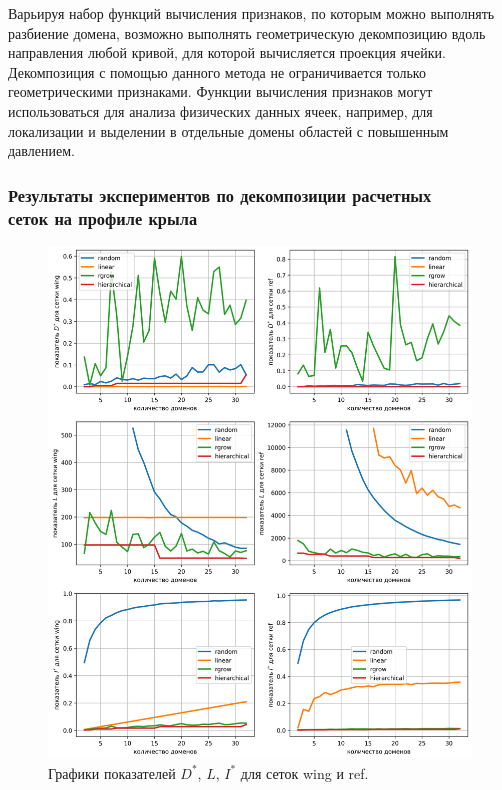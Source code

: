 Варьируя набор функций вычисления признаков, по которым можно выполнять разбиение домена, возможно выполнять геометрическую декомпозицию вдоль направления любой кривой, для которой вычисляется проекция ячейки.
Декомпозиция с помощью данного метода не ограничивается только геометрическими признаками.
Функции вычисления признаков могут использоваться для анализа физических данных ячеек, например, для локализации и выделении в отдельные домены областей с повышенным давлением.

\subsubsection{Результаты экспериментов по декомпозиции расчетных \\ сеток на профиле крыла}

\begin{figure}[H]
\centering
\includegraphics[width=1.0\textwidth]{./pics/text_2_decompsurf/qual.png}
\singlespacing
{}\caption{Графики показателей $D^{*}$, $L$, $I^{*}$ для сеток wing и ref.}
\label{fig:text_2_decompsurf_qual}
\end{figure}

